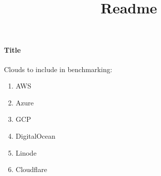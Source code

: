 \documentclass[11pt]{article}
\begin{document}
\title{Readme}

    \paragraph{Title}
    Clouds to include in benchmarking:
    \begin{enumerate}
        \item AWS
        \item Azure
        \item GCP
        \item DigitalOcean
        \item Linode
        \item Cloudflare
    \end{enumerate}
\end{document}
